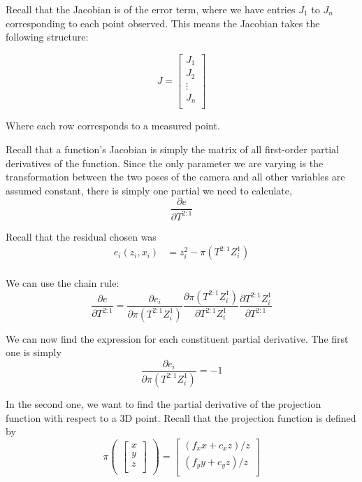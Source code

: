\documentclass[twoside]{article}
\begin{document}
Recall that the Jacobian is of the error term, where we have entries $J_1$ to $J_n$ corresponding to each point observed. This means the Jacobian takes the following structure:

\begin{equation}
J = 
\begin{bmatrix}
J_1 \\
J_2 \\
\vdots \\
J_n \\
\end{bmatrix}
\end{equation}

Where each row corresponds to a measured point.

Recall that a function's Jacobian is simply the matrix of all first-order partial derivatives of the function. Since the only parameter we are varying is the transformation between the two poses of the camera and all other variables are assumed constant, there is simply one partial we need to calculate, 
\begin{equation}
\frac{\partial e}{\partial T^{2:1}}
\end{equation}

Recall that the residual chosen was 
\begin{equation}
\begin{split}
e_i(z_i, x_i) &= z^2_i - \pi (T^{2:1} Z_i^1) \\
\end{split}
\end{equation}

We can use the chain rule:
\begin{equation}
\frac{\partial e}{\partial T^{2:1}} = \frac{\partial e_i}{\partial \pi (T^{2:1} Z_i^1)} \frac{\partial \pi (T^{2:1} Z_i^1)}{\partial T^{2:1} Z_i^1} \frac{\partial T^{2:1} Z_i^1}{\partial T^{2:1}}
\end{equation}

We can now find the expression for each constituent partial derivative. 
The first one is simply 
\begin{equation}
\frac{\partial e_i}{\partial \pi (T^{2:1} Z_i^1)} = -1 
\end{equation}

In the second one, we want to find the partial derivative of the projection function with respect to a 3D point. Recall that the projection function is defined by 
\begin{equation}
\pi 
\begin{pmatrix}
\begin{bmatrix}
x \\
y \\
z \\
\end{bmatrix}
\end{pmatrix}
 = 
\begin{bmatrix}
(f_xx + c_xz)/z \\
(f_yy + c_yz)/z \\
\end{bmatrix}
\end{equation}
\end{document}
